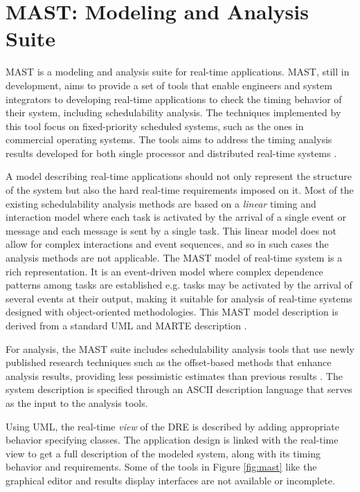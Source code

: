 \section{MAST: Modeling and Analysis Suite}

MAST \cite{934015} is a modeling and analysis suite for real-time applications. MAST, still in development, aims to provide a set of tools that enable engineers and system integrators to developing real-time applications to check the timing behavior of their system, including schedulability analysis. The techniques implemented by this tool focus on fixed-priority scheduled systems, such as the ones in commercial operating systems. The tools aims to address the timing analysis results developed for both single processor \cite{liu1973scheduling, klein2012practitioner} and distributed real-time systems \cite{palencia1999exploiting, tindell1994holistic}. 

A model describing real-time applications should not only represent the structure of the system but also the hard real-time requirements imposed on it. Most of the existing schedulability analysis methods are based on a \emph{linear} timing and interaction model where each task is activated by the arrival of a single event or message and each message is sent by a single task. This linear model does not allow for complex interactions and event sequences, and so in such cases the analysis methods are not applicable. The MAST model of real-time system is a rich representation. It is an event-driven model where complex dependence patterns among tasks are established e.g. tasks may be activated by the arrival of several events at their output, making it suitable for analysis of real-time systems designed with object-oriented methodologies. This MAST model description is derived from a standard UML and MARTE description \cite{medina2011}. 

For analysis, the MAST suite includes schedulability analysis tools that use newly published research techniques such as the offset-based methods \cite{palencia1998schedulability} that enhance analysis results, providing less pessimistic estimates than previous results \cite{tindell1994holistic}. The system description is specified through an ASCII description language that serves as the input to the analysis tools. 

Using UML, the real-time \emph{view} of the DRE is described \cite{selic2000generic} by adding appropriate behavior specifying classes. The application design is linked with the real-time view to get a full description of the modeled system, along with its timing behavior and requirements. Some of the tools in Figure \ref{fig:mast} like the graphical editor and results display interfaces are not available or incomplete.

